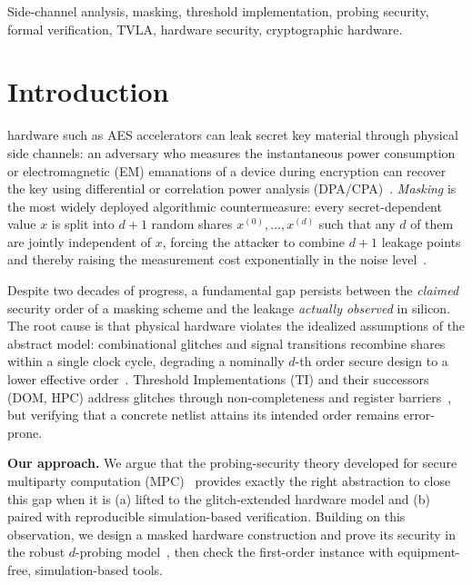 \documentclass[lettersize,journal]{IEEEtran}
\newcommand{\share}[2]{#1^{(#2)}}
\begin{document}
\begin{IEEEkeywords}
Side-channel analysis, masking, threshold implementation, probing security,
formal verification, TVLA, hardware security, cryptographic hardware.
\end{IEEEkeywords}

\section{Introduction}
 hardware such as AES accelerators can leak secret
key material through physical side channels: an adversary who measures the
instantaneous power consumption or electromagnetic (EM) emanations of a device
during encryption can recover the key using differential or correlation power
analysis (DPA/CPA)~\cite{kocher1999dpa,brier2004cpa}. \emph{Masking} is the
most widely deployed algorithmic countermeasure: every secret-dependent value
$x$ is split into $d+1$ random shares $\share{x}{0},\dots,\share{x}{d}$ such
that any $d$ of them are jointly independent of $x$, forcing the attacker to
combine $d+1$ leakage points and thereby raising the measurement cost
exponentially in the noise level~\cite{ishai2003private,chari1999towards}.

Despite two decades of progress, a fundamental gap persists between the
\emph{claimed} security order of a masking scheme and the leakage \emph{actually
observed} in silicon. The root cause is that physical hardware violates the
idealized assumptions of the abstract model: combinational glitches and signal
transitions recombine shares within a single clock cycle, degrading a nominally
$d$-th order secure design to a lower effective order~\cite{mangard2005glitch,
nikova2006threshold}. Threshold Implementations (TI) and their successors
(DOM, HPC) address glitches through non-completeness and register
barriers~\cite{nikova2006threshold,gross2016dom,cassiers2020hpc}, but verifying
that a concrete netlist attains its intended order remains error-prone.

\textbf{Our approach.} We argue that the probing-security theory developed for
secure multiparty computation (MPC)~\cite{ishai2003private} provides exactly the
right abstraction to close this gap when it is (a) lifted to the
glitch-extended hardware model and (b) paired with reproducible simulation-based
verification. Building on this observation, we design a masked hardware
construction and prove its security in the robust $d$-probing
model~\cite{faust2018composable}, then check the first-order instance with equipment-free,
simulation-based tools.
\end{document}
